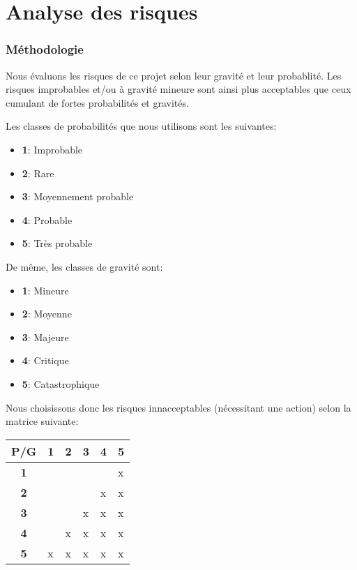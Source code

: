 \chapter*{Analyse des risques}

\subsection*{Méthodologie}

Nous évaluons les risques de ce projet selon leur gravité et leur probablité. Les risques improbables et/ou à gravité mineure sont ainsi plus acceptables que ceux cumulant de fortes probabilités et gravités.

Les classes de probabilités que nous utilisons sont les suivantes:

\begin{itemize}
  \item \textbf{1}: Improbable 
  \item \textbf{2}: Rare
  \item \textbf{3}: Moyennement probable
  \item \textbf{4}: Probable
  \item \textbf{5}: Très probable
\end{itemize}

De même, les classes de gravité sont:

\begin{itemize}
  \item \textbf{1}: Mineure 
  \item \textbf{2}: Moyenne
  \item \textbf{3}: Majeure
  \item \textbf{4}: Critique
  \item \textbf{5}: Catastrophique
\end{itemize}

Nous choisissons donc les risques innacceptables (nécessitant une action) selon la matrice suivante:

\begin{tabular}{|c|l|l|l|l|l|}
     \hline
         P/G & \textbf{1} & \textbf{2} & \textbf{3} & \textbf{4} & \textbf{5}  \\ \hline
         \textbf{1} &   &   &   &   & x \\ \hline
         \textbf{2} &   &   &   & x & x \\ \hline
         \textbf{3} &   &   & x & x & x \\ \hline
         \textbf{4} &   & x & x & x & x \\ \hline
         \textbf{5} & x & x & x & x & x \\
     \hline
\end{tabular}

